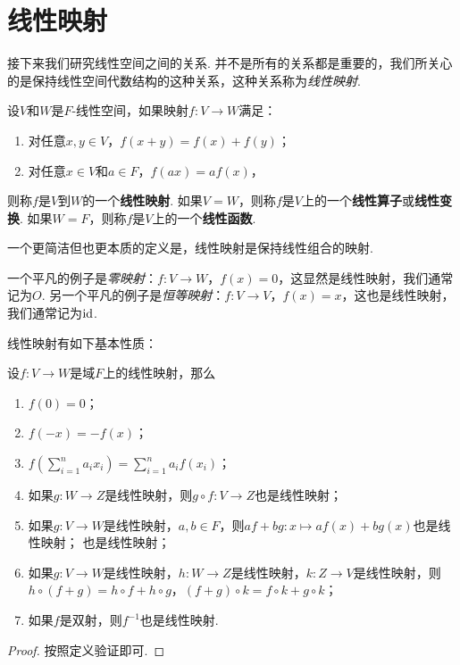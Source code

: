 \section{线性映射}

接下来我们研究线性空间之间的关系. 并不是所有的关系都是重要的，我们所关心的是保持线性空间代数结构的这种关系，这种关系称为\textit{线性映射}. 

\begin{definition}
设$V$和$W$是$F$-线性空间，如果映射$f:V\to W$满足：
\begin{enumerate}
    \item 对任意$x,y\in V$，$f(x+y)=f(x)+f(y)$；
    \item 对任意$x\in V$和$a\in F$，$f(ax)=af(x)$，
\end{enumerate}
则称$f$是$V$到$W$的一个\textbf{线性映射}. 如果$V=W$，则称$f$是$V$上的一个\textbf{线性算子}或\textbf{线性变换}. 如果$W=F$，则称$f$是$V$上的一个\textbf{线性函数}.
\end{definition}

一个更简洁但也更本质的定义是，线性映射是保持线性组合的映射. 

\begin{example}
一个平凡的例子是\textit{零映射}：$f:V\to W$，$f(x)=0$，这显然是线性映射，我们通常记为$O$. 另一个平凡的例子是\textit{恒等映射}：$f:V\to V$，$f(x)=x$，这也是线性映射，我们通常记为$\mathrm{id}$.
\end{example}

线性映射有如下基本性质：

\begin{proposition}\label{prop:linear-map-basic}
设$f:V\to W$是域$F$上的线性映射，那么
\begin{enumerate}
    \item $f(0)=0$；
    \item $f(-x)=-f(x)$；
    \item $f(\sum_{i=1}^n a_ix_i)=\sum_{i=1}^n a_if(x_i)$；
    \item 如果$g:W\to Z$是线性映射，则$g\circ f:V\to Z$也是线性映射；
    \item 如果$g:V\to W$是线性映射，$a,b\in F$，则$af+bg:x\mapsto af(x)+bg(x)$也是线性映射；
    也是线性映射；
    \item 如果$g:V\to W$是线性映射，$h:W\to Z$是线性映射，$k:Z\to V$是线性映射，则$h\circ(f+g)=h\circ f+h\circ g$，$(f+g)\circ k = f\circ k+g\circ k$；
    \item 如果$f$是双射，则$f^{-1}$也是线性映射. 
\end{enumerate}
\end{proposition}
\begin{proof}
    按照定义验证即可. 
\end{proof}

